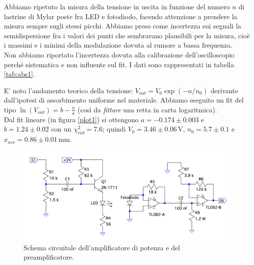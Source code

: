 \documentclass[10pt,a4paper]{article}
\begin{document}
Abbiamo ripetuto la misura della tensione in uscita in funzione del numero $n$ di lastrine di Mylar poste fra LED e fotodiodo, facendo attenzione a prendere   la misura sempre sugli stessi picchi. 
Abbiamo preso come incertezza sui segnali la semidispersione fra i valori dei punti che sembravano plausibili per la misura, cioè i massimi e i minimi della modulazione dovuta al rumore a bassa frequenza.\\
Non abbiamo riportato l'incertezza dovuta alla  calibrazione dell'oscilloscopio perché sistematica e non influente sul fit. I dati sono rappresentati in tabella \ref{tab:abs1}. 

E' noto l'andamento teorico della tensione: $V_{out}=V_0 \exp(-n/n_0)$ derivante dall'ipotesi di assorbimento uniforme nel materiale. Abbiamo eseguito un fit del tipo $\ln(V_{out})=b-\frac{n}{a}$ (così da \emph{fittare} una retta in carta logaritmica). \\ %
Dal fit lineare (in figura \ref{plot1}) si ottengono $a=-0.174\pm0.003$ e $b=1.24\pm0.02$ con un $\chi^2_{rid}=7.6$; quindi $V_0= 3.46\pm0.06\,\mbox{V}$, $n_0=5.7\pm0.1$ e $x_{ass}=0.86\pm0.01\,\mbox{mm}$.


\begin{figure}[!htb]
  \centering
  \includegraphics[scale=0.75]{ampli-preampli.png}
\caption{Schema circuitale dell'amplificatore di potenza e del preamplificatore.\label{fig:ampli-preampli}}
\end{figure}
\end{document}
